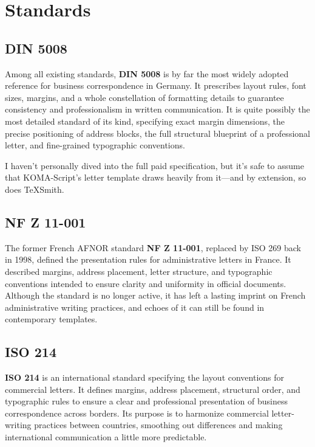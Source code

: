 \documentclass[a4paper,twoside]{article}
\begin{document}
\section{Standards}
\subsection{DIN 5008}
Among all existing standards, \textbf{DIN 5008} is by far the most widely adopted reference for business correspondence in Germany. It prescribes layout rules, font sizes, margins, and a whole constellation of formatting details to guarantee consistency and professionalism in written communication. It is quite possibly the most detailed standard of its kind, specifying exact margin dimensions, the precise positioning of address blocks, the full structural blueprint of a professional letter, and fine-grained typographic conventions.

I haven't personally dived into the full paid specification, but it's safe to assume that KOMA-Script's letter template draws heavily from it---and by extension, so does TeXSmith.
\subsection{NF Z 11-001}
The former French AFNOR standard \textbf{NF Z 11-001}, replaced by ISO 269 back in 1998, defined the presentation rules for administrative letters in France. It described margins, address placement, letter structure, and typographic conventions intended to ensure clarity and uniformity in official documents. Although the standard is no longer active, it has left a lasting imprint on French administrative writing practices, and echoes of it can still be found in contemporary templates.
\subsection{ISO 214}
\textbf{ISO 214} is an international standard specifying the layout conventions for commercial letters. It defines margins, address placement, structural order, and typographic rules to ensure a clear and professional presentation of business correspondence across borders. Its purpose is to harmonize commercial letter-writing practices between countries, smoothing out differences and making international communication a little more predictable.
\end{document}
